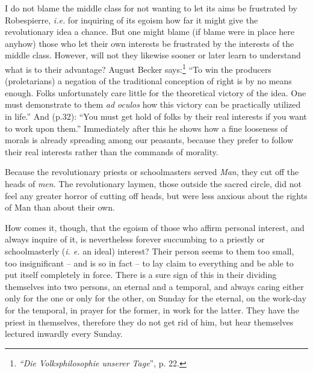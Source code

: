 \documentclass[12pt,a4paper]{book}
\begin{document}
I do not blame the middle class for not wanting to let its aims be frustrated 
by Robespierre, \textit{i.e.} for inquiring of its egoism how far it might 
give the revolutionary idea a chance. But one might blame (if blame were in 
place here anyhow) those who let their own interests be frustrated by the 
interests of the middle class. However, will not they likewise sooner or later 
learn to understand what is to their advantage? August Becker 
says:\footnote{\textit{``Die Volksphilosophie unserer Tage}'', p. 22.} ``To 
win the producers (proletarians) a negation of the traditional conception of 
right is by no means enough. Folks unfortunately care little for the 
theoretical victory of the idea. One must demonstrate to them \textit{ad 
oculos} how this victory can be practically utilized in life.'' And (p.32): 
``You must get hold of folks by their real interests if you want to work upon 
them.'' Immediately after this he shows how a fine looseness of morals is 
already spreading among our peasants, because they prefer to follow their real 
interests rather than the commands of morality.

Because the revolutionary priests or schoolmasters served \textit{Man}, they 
cut off the heads of \textit{men}. The revolutionary laymen, those outside the 
sacred circle, did not feel any greater horror of cutting off heads, but were 
less anxious about the rights of Man than about their own.

How comes it, though, that the egoism of those who affirm personal interest, 
and always inquire of it, is nevertheless forever succumbing to a priestly or 
schoolmasterly (\textit{i. e.} an ideal) interest? Their person seems to them 
too small, too insignificant -- and is so in fact -- to lay claim to 
everything and be able to put itself completely in force. There is a sure sign 
of this in their dividing themselves into two persons, an eternal and a 
temporal, and always caring either only for the one or only for the other, on 
Sunday for the eternal, on the work-day for the temporal, in prayer for the 
former, in work for the latter. They have the priest in themselves, therefore 
they do not get rid of him, but hear themselves lectured inwardly every 
Sunday.
\end{document}
